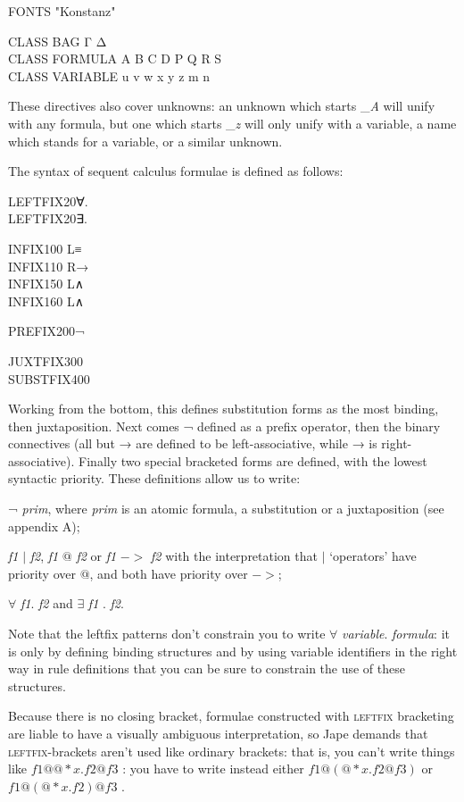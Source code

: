 \documentclass[11pt]{book}
\newcommand{\tab}{\hspace{5mm}}
\begin{document}
FONTS "Konstanz"

CLASS BAG Γ Δ\\
CLASS FORMULA A B C D P Q R S\\
CLASS VARIABLE u v w x y z m n


These directives also cover unknowns: an unknown which starts \_\textit{A} will unify with any formula, but one which starts \_\textit{z} will only unify with a variable, a name which stands for a variable, or a similar unknown.


The syntax of sequent calculus formulae is defined as follows:

LEFTFIX\tab 20\tab ∀.\\
LEFTFIX\tab 20\tab ∃.

INFIX\tab 100 L\tab ≡\\
INFIX\tab 110 R\tab →\\
INFIX\tab 150 L\tab ∧\\
INFIX\tab 160 L\tab ∧

PREFIX\tab 200\tab ¬

JUXTFIX\tab 300\\
SUBSTFIX\tab 400 


Working from the bottom, this defines substitution forms as the most binding, then juxtaposition. Next comes ¬ defined as a prefix operator, then the binary connectives (all but → are defined to be left-associative, while → is right-associative). Finally two special bracketed forms are defined, with the lowest syntactic priority. These definitions allow us to write:


{\textbullet}\tab ¬ \textit{prim}, where \textit{prim} is an atomic formula, a substitution or a juxtaposition (see appendix A);


{\textbullet}\tab \textit{f1} \ensuremath{|} \textit{f2}, \textit{f1} \ensuremath{@} \textit{f2} or \textit{f1} \ensuremath{->} \textit{f2} with the interpretation that \ensuremath{|} `operators' have priority over \ensuremath{@}, and both have priority over \ensuremath{->};


{\textbullet}\tab \ensuremath{\forall} \textit{f1}. \textit{f2} and \ensuremath{\exists} \textit{f1} . \textit{f2}.


Note that the leftfix patterns don't constrain you to write \ensuremath{\forall} \textit{variable}. \textit{formula}: it is only by defining binding structures and by using variable identifiers in the right way in rule definitions that you can be sure to constrain the use of these structures.


Because there is no closing bracket, formulae constructed with \textsc{leftfix} bracketing are liable to have a visually ambiguous interpretation, so Jape demands that \textsc{leftfix}-brackets aren't used like ordinary brackets: that is, you can't write things like $f1@@*x.f2@f3$ : you have to write instead either $f1@\left( @*x.f2@f3\right) $ or $f1@\left( @*x.f2\right) @f3$ .
\end{document}
